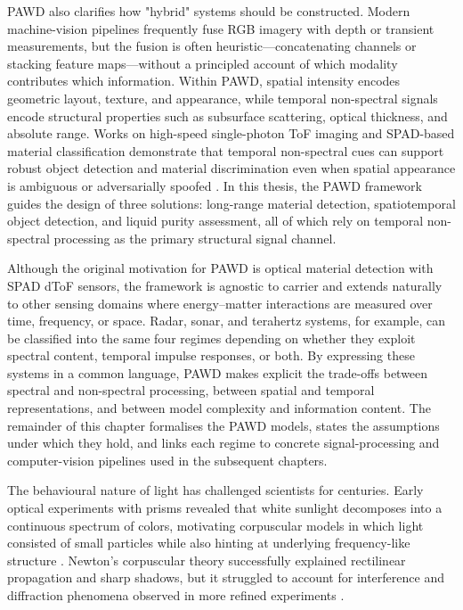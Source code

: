 \documentclass[12pt,a4paper,oneside]{report}
\begin{document}
PAWD also clarifies how "hybrid" systems should be constructed. Modern machine-vision pipelines frequently fuse RGB imagery with depth or transient measurements, but the fusion is often heuristic—concatenating channels or stacking feature maps—without a principled account of which modality contributes which information. Within PAWD, spatial intensity encodes geometric layout, texture, and appearance, while temporal non-spectral signals encode structural properties such as subsurface scattering, optical thickness, and absolute range. Works on high-speed single-photon ToF imaging and SPAD-based material classification demonstrate that temporal non-spectral cues can support robust object detection and material discrimination even when spatial appearance is ambiguous or adversarially spoofed \cite{moramartin2021,lyons2019,becker2023}. In this thesis, the PAWD framework guides the design of three solutions: long-range material detection, spatiotemporal object detection, and liquid purity assessment, all of which rely on temporal non-spectral processing as the primary structural signal channel.

Although the original motivation for PAWD is optical material detection with SPAD dToF sensors, the framework is agnostic to carrier and extends naturally to other sensing domains where energy–matter interactions are measured over time, frequency, or space. Radar, sonar, and terahertz systems, for example, can be classified into the same four regimes depending on whether they exploit spectral content, temporal impulse responses, or both. By expressing these systems in a common language, PAWD makes explicit the trade-offs between spectral and non-spectral processing, between spatial and temporal representations, and between model complexity and information content. The remainder of this chapter formalises the PAWD models, states the assumptions under which they hold, and links each regime to concrete signal-processing and computer-vision pipelines used in the subsequent chapters.

The behavioural nature of light has challenged scientists for centuries. Early optical experiments with prisms revealed that white sunlight decomposes into a continuous spectrum of colors, motivating corpuscular models in which light consisted of small particles while also hinting at underlying frequency-like structure \cite{crew1900}. Newton's corpuscular theory successfully explained rectilinear propagation and sharp shadows, but it struggled to account for interference and diffraction phenomena observed in more refined experiments \cite{crew1900}.
\end{document}
